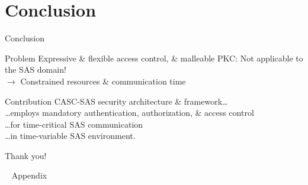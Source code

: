 \documentclass[en]{sdqbeamer}
\begin{document}
\section{Conclusion}
\begin{frame}{Conclusion}
    \begin{redblock}{Problem}
        Expressive \& flexible access control, \& malleable PKC: Not applicable to the SAS domain!
        \\$\rightarrow$ Constrained resources \& communication time
    \end{redblock}
    \begin{blueblock}{Contribution}
        CASC-SAS security architecture \& framework\dots
        \\\dots employs mandatory authentication, authorization, \& access control
        \\\dots for time-critical SAS communication
        \\\dots in time-variable SAS environment.
    \end{blueblock}
    \vspace{0.5em}
    \centering
    \huge
    Thank you!
\end{frame}

\appendix
\beginbackup
\begin{frame}{~}
    \centering
    \huge
    Appendix
\end{frame}
\end{document}
